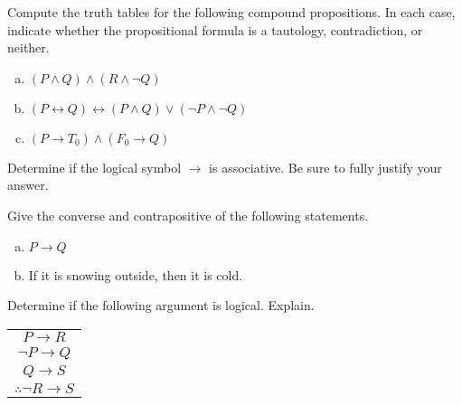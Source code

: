 \documentclass[11pt,letterpaper]{article}
\begin{document}
\newpage





 Compute the truth tables for the following compound propositions. In each case, indicate whether the propositional formula is a tautology, contradiction, or neither. 
	\begin{enumerate}[(a)]
	\item $(P \wedge Q) \wedge (R \wedge \neg Q)$
	\item $(P \leftrightarrow Q) \leftrightarrow (P \wedge Q) \vee (\neg P \wedge \neg Q)$
	\item $(P \to T_0) \wedge (F_0 \to Q)$
	\end{enumerate}





\newpage





 Determine if the logical symbol $\to$ is associative. Be sure to fully justify your answer. \pspace





\newpage





 Give the converse and contrapositive of the following statements. 
	\begin{enumerate}[(a)]
	\item $P \to Q$
	\item If it is snowing outside, then it is cold.
	\end{enumerate}





\newpage





 Determine if the following argument is logical. Explain. 
	\begin{table}[!ht]
	\centering
	\begin{tabular}{c}
	$P \to R$ \\
	$\neg P \to Q$ \\
	$Q \to S$ \\ \hline
	$\therefore \neg R \to S$
	\end{tabular}
	\end{table}
\end{document}
